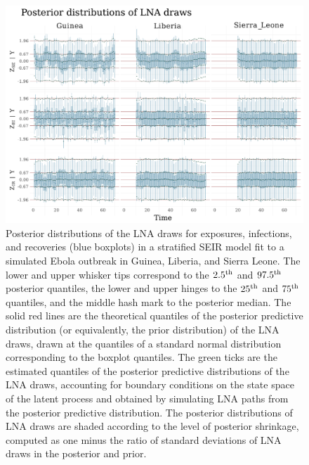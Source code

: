 \begin{figure}[htbp]
	\begin{fullpage}
		\centering
		\includegraphics[width=\linewidth]{figures/ebola_synth_drawplots}
		\caption[Posterior distributions of LNA draws for a stratified SEIR model fit to a simulated Ebola outbreak.]{Posterior distributions of the LNA draws for exposures, infections, and recoveries (blue boxplots) in a stratified SEIR model fit to a simulated Ebola outbreak in Guinea, Liberia, and Sierra Leone. The lower and upper whisker tips correspond to the $ 2.5^{\mathrm{th}} $ and $ 97.5^{\mathrm{th}} $ posterior quantiles, the lower and upper hinges to the $ 25^{\mathrm{th}} $ and $ 75^{\mathrm{th}} $ quantiles, and the middle hash mark to the posterior median. The solid red lines are the theoretical quantiles of the posterior predictive distribution (or equivalently, the prior distribution) of the LNA draws, drawn at the quantiles of a standard normal distribution corresponding to the boxplot quantiles. The green ticks are the estimated quantiles of the posterior predictive distributions of the LNA draws, accounting for boundary conditions on the state space of the latent process and obtained by simulating LNA paths from the posterior predictive distribution.  The posterior distributions of LNA draws are shaded according to the level of posterior shrinkage, computed as one minus the ratio of standard deviations of LNA draws in the posterior and prior.}
		\label{fig:ebola_synth_drawplots}
	\end{fullpage}
\end{figure}

\newpage
